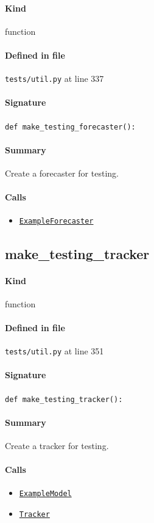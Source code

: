 \documentclass[11pt]{report}
\begin{document}
\paragraph{Kind} function
\paragraph{Defined in file} \texttt{tests/util.py} at line 337
\paragraph{Signature} \texttt{def make\_testing\_forecaster():}
\paragraph{Summary} Create a forecaster for testing.
\paragraph{Calls}
\begin{itemize}[leftmargin=*]
  \item \hyperref[def:tests-util.py:ExampleForecaster:L259]{\texttt{ExampleForecaster}}
\end{itemize}
\subsection{make\_testing\_tracker}
\label{def:tests-util.py:make_testing_tracker:L351}
\paragraph{Kind} function
\paragraph{Defined in file} \texttt{tests/util.py} at line 351
\paragraph{Signature} \texttt{def make\_testing\_tracker():}
\paragraph{Summary} Create a tracker for testing.
\paragraph{Calls}
\begin{itemize}[leftmargin=*]
  \item \hyperref[def:tests-util.py:ExampleModel:L25]{\texttt{ExampleModel}}
  \item \hyperref[def:tracker.py:Tracker:L19]{\texttt{Tracker}}
\end{itemize}
\end{document}
